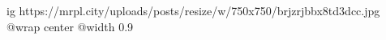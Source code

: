  
 
 
 
 

\ifcmt
  ig https://mrpl.city/uploads/posts/resize/w/750x750/brjzrjbbx8td3dcc.jpg
  @wrap center
  @width 0.9
\fi
